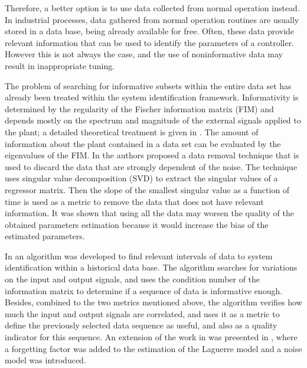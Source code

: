 \documentclass[letterpaper, 10 pt, conference]{ieeeconf}  %
\begin{document}
Therefore, a better option is to use data collected from normal operation instead. In industrial processes, data gathered from normal operation routines are usually stored in a data base, being already available for free. Often, these data provide relevant information that can be used to identify the parameters of a controller. However this is not always the case, and the use of noninformative data may result in inappropriate tuning.

The problem of searching for informative subsets within the entire data set has already been treated within the system identification framework.
Informativity is determined by the regularity of the Fischer information matrix (FIM) and depends mostly on the spectrum and magnitude of the external signals applied to the plant; a detailed theoretical treatment is given in \cite{gevers2009identification}. The amount of information about the plant contained in a data set can be evaluated by the eigenvalues of the FIM.  In \cite{carrette1996discarding} the authors proposed a data removal technique that is used to discard the data that are strongly dependent of the noise.
The technique uses singular value decomposition (SVD) to extract the singular values of a regressor matrix.
Then the slope of the smallest singular value as a function of time is used as a metric to remove the data that does not have relevant information.
It was shown that using all the data may worsen the quality of the obtained parameters estimation because it would increase the bias of the estimated parameters.

In \cite{peretzki2011data} an algorithm was developed to find relevant intervals of data to system identification within a historical data base.
The algorithm searches for variations on the input and output signals, and uses the condition number of the information matrix to determine if a sequence of data is informative enough.
Besides, combined to the two metrics mentioned above, the algorithm verifies how much the input and output signals are correlated, and uses it as a metric to define the previously selected data sequence as useful, and also as a quality indicator for this sequence.
An extension of the work in \cite{peretzki2011data} was presented in \cite{bittencourt2015algorithm}, where a forgetting factor was added to the estimation of the Laguerre model and a noise model was introduced.
\end{document}
